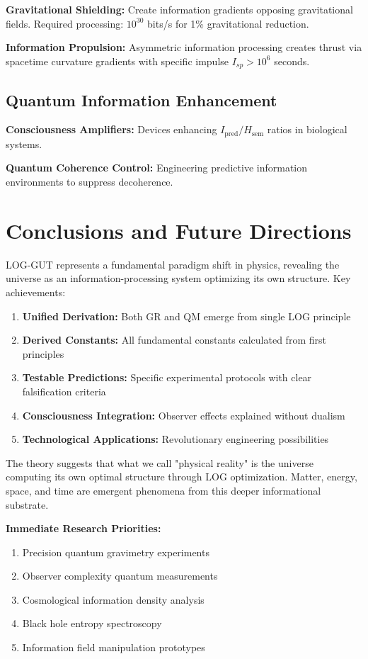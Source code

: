 \documentclass[12pt]{article}
\begin{document}
\textbf{Gravitational Shielding:} Create information gradients opposing gravitational fields. Required processing: $10^{30}$ bits/s for 1\% gravitational reduction.

\textbf{Information Propulsion:} Asymmetric information processing creates thrust via spacetime curvature gradients with specific impulse $I_{sp} > 10^6$ seconds.

\subsection{Quantum Information Enhancement}

\textbf{Consciousness Amplifiers:} Devices enhancing $I_{\mathrm{pred}}/H_{\mathrm{sem}}$ ratios in biological systems.

\textbf{Quantum Coherence Control:} Engineering predictive information environments to suppress decoherence.

\section{Conclusions and Future Directions}

LOG-GUT represents a fundamental paradigm shift in physics, revealing the universe as an information-processing system optimizing its own structure. Key achievements:
\begin{enumerate}
    \item \textbf{Unified Derivation:} Both GR and QM emerge from single LOG principle
    \item \textbf{Derived Constants:} All fundamental constants calculated from first principles
    \item \textbf{Testable Predictions:} Specific experimental protocols with clear falsification criteria
    \item \textbf{Consciousness Integration:} Observer effects explained without dualism
    \item \textbf{Technological Applications:} Revolutionary engineering possibilities
\end{enumerate}

The theory suggests that what we call "physical reality" is the universe computing its own optimal structure through LOG optimization. Matter, energy, space, and time are emergent phenomena from this deeper informational substrate.

\textbf{Immediate Research Priorities:}
\begin{enumerate}
    \item Precision quantum gravimetry experiments
    \item Observer complexity quantum measurements
    \item Cosmological information density analysis
    \item Black hole entropy spectroscopy
    \item Information field manipulation prototypes
\end{enumerate}
\end{document}
